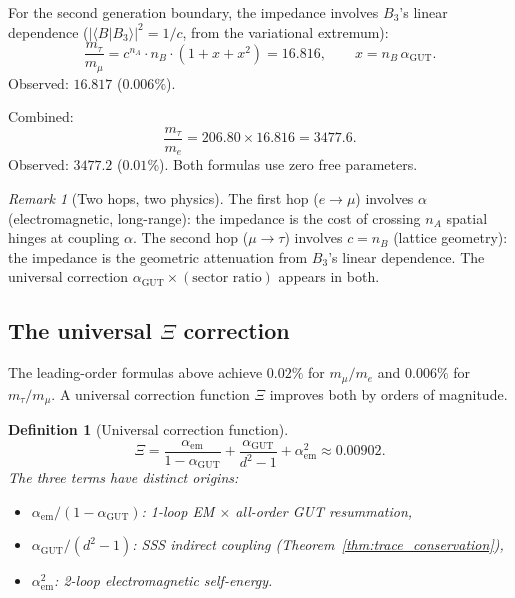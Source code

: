 \documentclass[12pt]{article}
\newtheorem{definition}[theorem]{Definition}
\theoremstyle{remark}
\newtheorem{remark}[theorem]{Remark}
\theoremstyle{definition}
\newcommand{\agut}{\alpha_{\mathrm{GUT}}}
\begin{document}
For the second generation boundary, the impedance involves $B_3$'s linear dependence ($|\langle B|B_3\rangle|^2 = 1/c$, from the variational extremum):
\begin{equation}
\label{eq:tau_mu}
\boxed{\frac{m_\tau}{m_\mu} = c^{n_A}\cdot n_B \cdot \left(1 + x + x^2\right) = 16.816, \qquad x = n_B\,\alpha_\mathrm{GUT}.}
\end{equation}
Observed: $16.817$ ($0.006\%$).

Combined:
\begin{equation}
\label{eq:tau_e}
\frac{m_\tau}{m_e} = 206.80 \times 16.816 = 3477.6.
\end{equation}
Observed: $3477.2$ ($0.01\%$).  Both formulas use zero free parameters.

\begin{remark}[Two hops, two physics]
The first hop ($e \to \mu$) involves $\alpha$ (electromagnetic, long-range): the impedance is the cost of crossing $n_A$ spatial hinges at coupling $\alpha$.  The second hop ($\mu \to \tau$) involves $c = n_B$ (lattice geometry): the impedance is the geometric attenuation from $B_3$'s linear dependence.  The universal correction $\alpha_\mathrm{GUT} \times (\text{sector ratio})$ appears in both.
\end{remark}

\subsection{The universal $\Xi$ correction}
\label{sec:xi_correction}

The leading-order formulas above achieve $0.02\%$ for $m_\mu/m_e$ and $0.006\%$ for $m_\tau/m_\mu$.  A universal correction function $\Xi$ improves both by orders of magnitude.

\begin{definition}[Universal correction function]
\begin{equation}
\Xi = \frac{\alpha_\mathrm{em}}{1 - \alpha_\mathrm{GUT}} + \frac{\alpha_\mathrm{GUT}}{d^2 - 1} + \alpha_\mathrm{em}^2 \approx 0.00902.
\end{equation}
The three terms have distinct origins:
\begin{itemize}
\item $\alpha_\mathrm{em}/(1 - \agut)$: 1-loop EM $\times$ all-order GUT resummation,
\item $\agut/(d^2 - 1)$: SSS indirect coupling (Theorem~\ref{thm:trace_conservation}),
\item $\alpha_\mathrm{em}^2$: 2-loop electromagnetic self-energy.
\end{itemize}
\end{definition}
\end{document}
